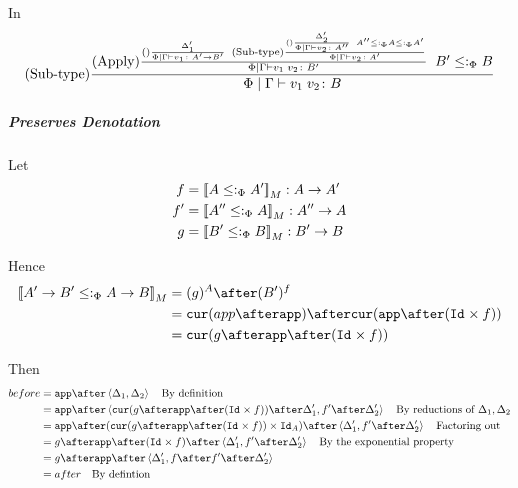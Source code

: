 \documentclass{report}
\begin{document}
            In
            \begin{equation}
                (\text{Sub-type}) \frac{
                    (\text{Apply}) \frac{
                        (\text{}) \frac{
                            \Delta'_1
                        }{
                            \Phi\mid\Gamma \vdash v_1 \colon A'\rightarrow B'
                        }
                    \;\;
                        (\text{Sub-type}) \frac{
                            (\text{}) \frac{\Delta'_2}{\Phi\mid\Gamma \vdash v_2 \colon A''}
                            \;\;
                            A'' \leq:_\Phi A \leq:_\Phi A'
                        }{
                            \Phi\mid\Gamma \vdash v_2 \colon A'
                        }
                    }{
                        \Phi\mid\Gamma \vdash v_1\; v_2 \colon B'
                    }
                    \;\;
                    B' \leq:_\Phi B
                }{
                    \Phi\mid\Gamma \vdash v_1\; v_2 \colon B
                }
            \end{equation}
            \subparagraph{Preserves Denotation}
                Let
                \begin{align}
                    f & = {\bf [\![}A\leq:_\Phi A'{\bf ]\!]}_M: A\rightarrow A' \\
                    f' & = {\bf [\![}A''\leq:_\Phi A{\bf ]\!]}_M: A'' \rightarrow A \\
                    g & = {\bf [\![}B' \leq:_\Phi B{\bf ]\!]}_M: B' \rightarrow B \\
                \end{align}

                Hence 
                \begin{align}
                    \deno{\fntype{A'}{B'}\subtypep \ab} & = (g)^A \after (B')^f \\
                    & = \cur{app\after \app}\after\cur{\app\after(\Id{}\times f)}\\
                    & = \cur {g\after\app\after(\Id{}\times f)}
                \end{align}

                Then 
                \begin{align}
                    before & = \app\after\pr{\D_1}{\D_2}\qt{By definition}\\
                    & = \app\after\pr{\cur {g\after\app\after(\Id{}\times f)}\after\D'_1}{f'\after\D'_2}\qt{By reductions of $\D_1, \D_2$}\\
                    & = \app\after(\cur {g\after\app\after(\Id{}\times f)}\times\Id{A})\after\pr{\D'_1}{f'\after\D'_2} \qt{Factoring out}\\
                    & = g\after\app\after(\Id{}\times f)\after\pr{\D'_1}{f'\after\D'_2}\qt{By the exponential property}\\
                    & = g\after\app\after\pr{\D'_1}{f\after f'\after \D'_2}\\
                    & = after\qt{By defintion}
                \end{align}
           
\end{document}
